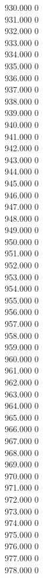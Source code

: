 { 930.000	0 \\
 931.000	0 \\
 932.000	0 \\
 933.000	0 \\
 934.000	0 \\
 935.000	0 \\
 936.000	0 \\
 937.000	0 \\
 938.000	0 \\
 939.000	0 \\
 940.000	0 \\
 941.000	0 \\
 942.000	0 \\
 943.000	0 \\
 944.000	0 \\
 945.000	0 \\
 946.000	0 \\
 947.000	0 \\
 948.000	0 \\
 949.000	0 \\
 950.000	0 \\
 951.000	0 \\
 952.000	0 \\
 953.000	0 \\
 954.000	0 \\
 955.000	0 \\
 956.000	0 \\
 957.000	0 \\
 958.000	0 \\
 959.000	0 \\
 960.000	0 \\
 961.000	0 \\
 962.000	0 \\
 963.000	0 \\
 964.000	0 \\
 965.000	0 \\
 966.000	0 \\
 967.000	0 \\
 968.000	0 \\
 969.000	0 \\
 970.000	0 \\
 971.000	0 \\
 972.000	0 \\
 973.000	0 \\
 974.000	0 \\
 975.000	0 \\
 976.000	0 \\
 977.000	0 \\
 978.000	0 \\
}
